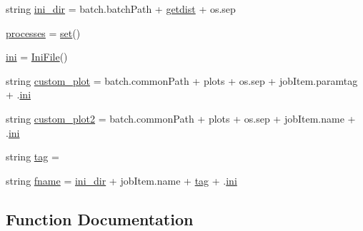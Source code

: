 \begin{DoxyCompactItemize}
\item 
string \mbox{\hyperlink{namespacerunGridGetdist_acae298d9a0099550bdf9d75b3ef72e47}{ini\+\_\+dir}} = batch.\+batch\+Path + \textquotesingle{}\mbox{\hyperlink{GetDist_8f90_a78c185cfd3ac27937ede022b24ae72e9}{getdist}}\textquotesingle{} + os.\+sep
\item 
\mbox{\hyperlink{namespacerunGridGetdist_ab09eb80a2e8268cd776c12f9f9d90aec}{processes}} = \mbox{\hyperlink{plotTT_8m_ae2445b699d1845d6abd1418ca39394c0}{set}}()
\item 
\mbox{\hyperlink{namespacerunGridGetdist_a5c45b173d8ff043e9a4f7dd67d9e5076}{ini}} = \mbox{\hyperlink{classgetdist_1_1inifile_1_1IniFile}{Ini\+File}}()
\item 
string \mbox{\hyperlink{namespacerunGridGetdist_aef778b568c58613ea29e2637d49d8e04}{custom\+\_\+plot}} = batch.\+common\+Path + \textquotesingle{}plots\textquotesingle{} + os.\+sep + job\+Item.\+paramtag + \textquotesingle{}.\mbox{\hyperlink{namespacerunGridGetdist_a5c45b173d8ff043e9a4f7dd67d9e5076}{ini}}\textquotesingle{}
\item 
string \mbox{\hyperlink{namespacerunGridGetdist_a0eb2709c4e717d93799be0aded61f5f1}{custom\+\_\+plot2}} = batch.\+common\+Path + \textquotesingle{}plots\textquotesingle{} + os.\+sep + job\+Item.\+name + \textquotesingle{}.\mbox{\hyperlink{namespacerunGridGetdist_a5c45b173d8ff043e9a4f7dd67d9e5076}{ini}}\textquotesingle{}
\item 
string \mbox{\hyperlink{namespacerunGridGetdist_a533e66844598c5a6bfdfe6e81d24859d}{tag}} = \textquotesingle{}\textquotesingle{}
\item 
string \mbox{\hyperlink{namespacerunGridGetdist_aa70fea69807ee2a64c74791e8994967e}{fname}} = \mbox{\hyperlink{namespacerunGridGetdist_acae298d9a0099550bdf9d75b3ef72e47}{ini\+\_\+dir}} + job\+Item.\+name + \mbox{\hyperlink{namespacerunGridGetdist_a533e66844598c5a6bfdfe6e81d24859d}{tag}} + \textquotesingle{}.\mbox{\hyperlink{namespacerunGridGetdist_a5c45b173d8ff043e9a4f7dd67d9e5076}{ini}}\textquotesingle{}
\end{DoxyCompactItemize}


\subsection{Function Documentation}
\mbox{\label{namespacerunGridGetdist_a7ba1f97b655387533e6ce36767ef8e8f}} 
